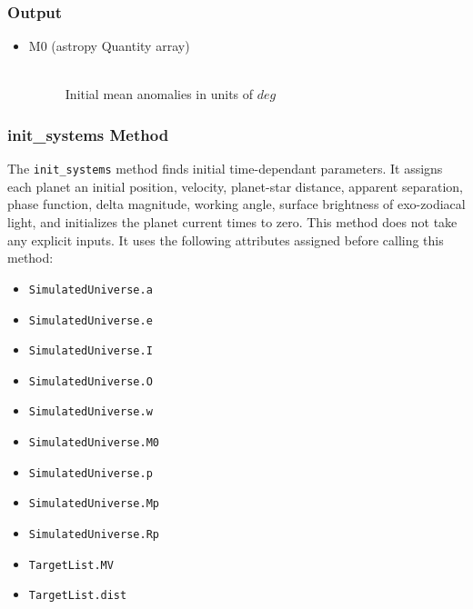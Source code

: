 \documentclass[cleanfoot]{asme2ej}
\begin{document}
\subsubsection*{Output}
\begin{itemize}
    \item 
    \begin{description}
        \item[M0 (astropy Quantity array)] \hfill \\
        Initial mean anomalies in units of $deg$
    \end{description}
\end{itemize}

\subsubsection{init\_systems Method} \label{sec:initsystemstask}
The \verb+init_systems+ method finds initial time-dependant parameters. It assigns each planet an initial position, velocity, planet-star distance, apparent separation, phase function, delta magnitude, working angle, surface brightness of exo-zodiacal light, and initializes the planet current times to zero. This method does not take any explicit inputs.  It uses the following attributes assigned before calling this method:
\begin{itemize}
    \item \verb+SimulatedUniverse.a+
    \item \verb+SimulatedUniverse.e+
    \item \verb+SimulatedUniverse.I+
    \item \verb+SimulatedUniverse.O+
    \item \verb+SimulatedUniverse.w+
    \item \verb+SimulatedUniverse.M0+
    \item \verb+SimulatedUniverse.p+
    \item \verb+SimulatedUniverse.Mp+
    \item \verb+SimulatedUniverse.Rp+
    \item \verb+TargetList.MV+
    \item \verb+TargetList.dist+
\end{itemize}
\end{document}
